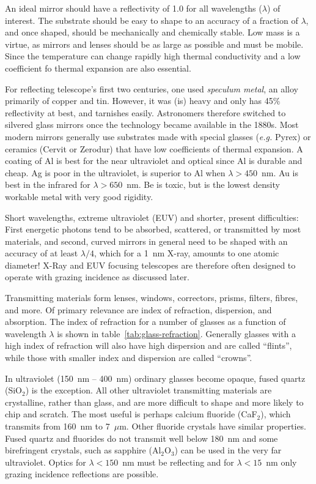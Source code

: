 An ideal mirror should have a reflectivity of 1.0 for all wavelengths ($\lambda$) of interest. The
substrate should be easy to shape to an accuracy of a fraction of $\lambda$, and once shaped, 
should be mechanically and chemically stable. Low mass is a virtue, as mirrors and lenses should
be as large as possible and must be mobile. Since the temperature can change rapidly high 
thermal conductivity and a low coefficient fo thermal expansion are also essential.

For reflecting telescope's first two centuries, one used {\it speculum metal}, an alloy
primarily of copper and tin. However, it was (is) heavy and only has 45\% reflectivity at best, 
and tarnishes easily. Astronomers therefore switched to silvered glass mirrors once the 
technology became available in the 1880s. Most modern mirrors generally use substrates
made with special glasses ({\it e.g.} Pyrex) or ceramics (Cervit or Zerodur) that have low
coefficients of thermal expansion. A coating of Al is best for the near ultraviolet and optical
since Al is durable and cheap. Ag is poor in the ultraviolet, is superior to Al when 
$\lambda>450$~nm. Au is best in the infrared for $\lambda>650$~nm. Be is toxic, but is the
lowest density workable metal with very good rigidity. 

Short wavelengths, extreme ultraviolet (EUV) and shorter, present
difficulties: First energetic photons tend to be absorbed, scattered,
or transmitted by most materials, and second, curved mirrors in general
need to be shaped with an accuracy of at least $\lambda/4$, which for
a 1~nm X-ray, amounts to one atomic diameter! X-Ray and EUV focusing
telescopes are therefore often designed to operate with grazing
incidence as discussed later.

Transmitting materials form lenses, windows, correctors, prisms, filters, fibres, and more. Of
primary relevance are index of refraction, dispersion, and absorption. The index of refraction for
a number of glasses as a function of wavelength $\lambda$ is shown in table~\ref{tab:glass-refraction}. Generally glasses with a high index of refraction will also have high dispersion and are called ``flints'', while those with smaller index and dispersion are 
called ``crowns''. 

In ultraviolet (150~nm -- 400~nm) ordinary glasses become opaque, fused quartz (SiO$_2$) is
the exception. All other ultraviolet transmitting materials are crystalline, rather than glass, and
are more difficult to shape and more likely to chip and scratch. The most useful is perhaps
calcium fluoride (CaF$_2$), which transmits from 160~nm to 7~$\mu$m. Other fluoride crystals
have similar properties. Fused quartz and fluorides do not transmit well below 180~nm and some
birefringent crystals, such as sapphire (Al$_2$O$_3$) can be used in the very far ultraviolet.
Optics for $\lambda < 150$~nm must be reflecting and for $\lambda < 15$~nm only grazing
incidence reflections are possible.

